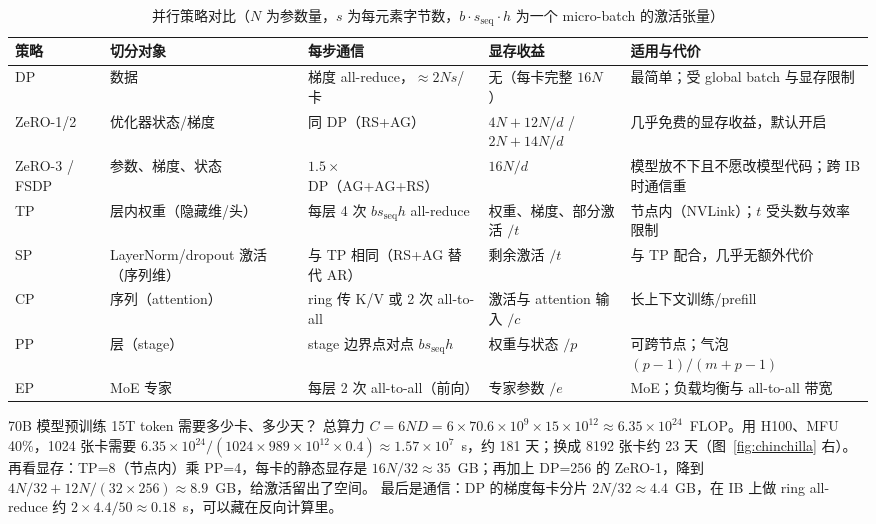 \begin{table}[!t]
\centering
\caption{并行策略对比（$N$ 为参数量，$s$ 为每元素字节数，$b\cdot s_{\text{seq}}\cdot h$ 为一个 micro-batch 的激活张量）}
\label{tab:parallel}
\footnotesize
\begin{tabularx}{\textwidth}{@{}l L{2.4cm} L{3.4cm} L{3.6cm} Y@{}}
\toprule
策略 & 切分对象 & 每步通信 & 显存收益 & 适用与代价 \\
\midrule
DP~\cite{li2020pytorch} & 数据 & 梯度 all-reduce，$\approx2Ns$/卡 & 无（每卡完整 $16N$） & 最简单；受 global batch 与显存限制 \\
ZeRO-1/2~\cite{rajbhandari2020zero} & 优化器状态/梯度 & 同 DP（RS+AG） & $4N+12N/d$ / $2N+14N/d$ & 几乎免费的显存收益，默认开启 \\
ZeRO-3 / FSDP~\cite{rajbhandari2020zero,zhao2023pytorch} & 参数、梯度、状态 & $1.5\times$ DP（AG+AG+RS） & $16N/d$ & 模型放不下且不愿改模型代码；跨 IB 时通信重 \\
TP~\cite{shoeybi2019megatron} & 层内权重（隐藏维/头） & 每层 4 次 $bs_{\text{seq}}h$ all-reduce & 权重、梯度、部分激活 $/t$ & 节点内（NVLink）；$t$ 受头数与效率限制 \\
SP~\cite{korthikanti2023reducing} & LayerNorm/dropout 激活（序列维） & 与 TP 相同（RS+AG 替代 AR） & 剩余激活 $/t$ & 与 TP 配合，几乎无额外代价 \\
CP~\cite{liu2023ring,jacobs2023deepspeed} & 序列（attention） & ring 传 K/V 或 2 次 all-to-all & 激活与 attention 输入 $/c$ & 长上下文训练/prefill \\
PP~\cite{huang2019gpipe,narayanan2019pipedream} & 层（stage） & stage 边界点对点 $bs_{\text{seq}}h$ & 权重与状态 $/p$ & 可跨节点；气泡 $(p-1)/(m+p-1)$ \\
EP~\cite{lepikhin2021gshard,fedus2022switch} & MoE 专家 & 每层 2 次 all-to-all（前向） & 专家参数 $/e$ & MoE；负载均衡与 all-to-all 带宽 \\
\bottomrule
\end{tabularx}
\end{table}

\begin{est}{70B 模型预训练 15T token 需要多少卡、多少天？}
总算力 $C=6ND=6\times70.6\times10^9\times15\times10^{12}\approx6.35\times10^{24}$~FLOP。用 H100、MFU 40\%，1024 张卡需要
$6.35\times10^{24}/(1024\times989\times10^{12}\times0.4)\approx1.57\times10^7$~s，约 181 天；换成 8192 张卡约 23 天（图~\ref{fig:chinchilla} 右）。
再看显存：TP=8（节点内）乘 PP=4，每卡的静态显存是 $16N/32\approx35$~GB；再加上 DP=256 的 ZeRO-1，降到 $4N/32+12N/(32\times256)\approx8.9$~GB，给激活留出了空间。
最后是通信：DP 的梯度每卡分片 $2N/32\approx4.4$~GB，在 IB 上做 ring all-reduce 约 $2\times4.4/50\approx0.18$~s，可以藏在反向计算里。
\end{est}

